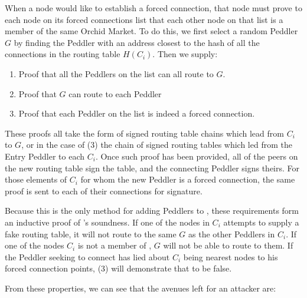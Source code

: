 {\color{red} When a node would like to establish a forced connection, that node must prove to each node on its forced connections list that each other node on that list is a member of the same Orchid Market. To do this, we first select a random Peddler $G$ by finding the Peddler with an address closest to the hash of all the connections in the routing table $H(C_i)$. Then we supply:}

\begin{enumerate}
\item Proof that all the Peddlers on the list can all route to $G$.
\item Proof that $G$ can route to each Peddler
\item Proof that each Peddler on the list is indeed a forced connection.
\end{enumerate}

These proofs all take the form of signed routing table chains which lead from $C_i$ to $G$, or in the case of (3) the chain of signed routing tables which led from the Entry Peddler to each $C_i$. Once such proof has been provided, all of the peers on the new routing table sign the table, and the connecting Peddler signs theirs. For those elements of $C_i$ for whom the new Peddler is a forced connection, the same proof is sent to each of their connections for signature.

Because this is the only method for adding Peddlers to \tOM{}, these requirements form an inductive proof of \tOM{}'s soundness. If one of the nodes in $C_i$ attempts to supply a fake routing table, it will not route to the same $G$ as the other Peddlers in $C_i$. If one of the nodes $C_i$ is not a member of \tOM{}, $G$ will not be able to route to them. If the Peddler seeking to connect has lied about $C_i$ being nearest nodes to his forced connection points, (3) will demonstrate that to be false.

From these properties, we can see that the avenues left for an attacker are:

